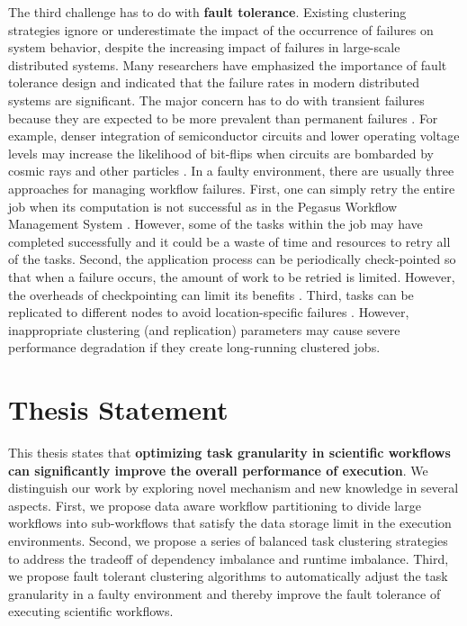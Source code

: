 The third challenge has to do with \textbf{fault tolerance}. Existing clustering strategies ignore or underestimate the impact of the occurrence of failures on system behavior, despite the increasing impact of failures in large-scale distributed systems. Many researchers \cite{Zhang2004, Tang1990, Schroeder2006, Sahoo2004} have emphasized the importance of fault tolerance design and indicated that the failure rates in modern distributed systems are significant. The major concern has to do with transient failures because they are expected to be more prevalent than permanent failures \cite{Zhang2004}. For example, denser integration of semiconductor circuits and lower operating voltage levels may increase the likelihood of bit-flips when circuits are bombarded by cosmic rays and other particles \cite{Zhang2004}. In a faulty environment, there are usually three approaches for managing workflow failures. First, one can simply retry the entire job when its computation is not successful as in the Pegasus Workflow Management System \cite{Deelman2004}. However, some of the tasks within the job may have completed successfully and it could be a waste of time and resources to retry all of the tasks. Second, the application process can be periodically check-pointed so that when a failure occurs, the amount of work to be retried is limited. However, the overheads of checkpointing can limit its benefits \cite{Zhang2004}. Third, tasks can be replicated to different nodes to avoid location-specific failures \cite{Zhang2009}. However, inappropriate clustering (and replication) parameters may cause severe performance degradation if they create long-running clustered jobs. 




\section{Thesis Statement}
This thesis states that \textbf{optimizing task granularity in scientific workflows can significantly improve the overall performance of execution}. We distinguish our work by exploring novel mechanism and new knowledge in several aspects. First, we propose data aware workflow partitioning to divide large workflows into sub-workflows that satisfy the data storage limit in the execution environments. Second, we propose a series of balanced task clustering strategies to address the tradeoff of dependency imbalance and runtime imbalance. Third, we propose fault tolerant clustering algorithms to automatically adjust the task granularity in a faulty environment and thereby improve the fault tolerance of executing scientific workflows. 


